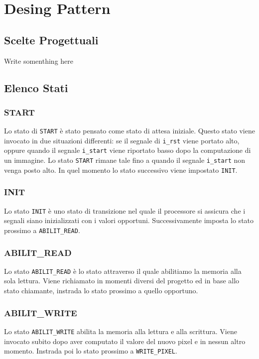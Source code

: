 \documentclass{article}
\begin{document}
\section{Desing Pattern} %
\subsection{Scelte Progettuali} %
Write somenthing here

\subsection{Elenco Stati}

\subsubsection{START} %
Lo stato di \texttt{START} è stato pensato come stato di attesa iniziale. Questo stato viene invocato in due situazioni differenti: se il segnale di \texttt{i\_rst} viene portato alto, oppure quando il segnale \texttt{i\_start} viene riportato basso dopo la computazione di un immagine. Lo stato \texttt{START} rimane tale fino a quando il segnale \texttt{i\_start} non venga posto alto. In quel momento lo stato successivo viene impostato \texttt{INIT}.

\subsubsection{INIT}%
Lo stato \texttt{INIT} è uno stato di transizione nel quale il processore si assicura che i segnali siano inizializzati con i valori opportuni. Successivamente imposta lo stato prossimo a \texttt{ABILIT\_READ}.

\subsubsection{ABILIT\_READ}%
Lo stato \texttt{ABILIT\_READ} è lo stato attraverso il quale abilitiamo la memoria alla sola lettura. Viene richiamato in momenti diversi del progetto ed in base allo stato chiamante, instrada lo stato prossimo a quello opportuno.

\subsubsection{ABILIT\_WRITE}%
Lo stato \texttt{ABILIT\_WRITE} abilita la memoria alla lettura e alla scrittura. Viene invocato subito dopo aver computato il valore del nuovo pixel e in nessun altro momento. Instrada poi lo stato prossimo a \texttt{WRITE\_PIXEL}.
\end{document}
